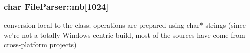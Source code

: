 \subsubsection[{mb}]{\setlength{\rightskip}{0pt plus 5cm}char File\-Parser\-::mb\mbox{[}1024\mbox{]}\hspace{0.3cm}{\ttfamily [private]}}\label{class_file_parser_a01a48fb6719f33f2dce2dd6adb71198f}
conversion local to the class; operations are prepared using char$\ast$ strings (since we're not a totally Windows-\/centric build, most of the sources have come from cross-\/platform projects) 